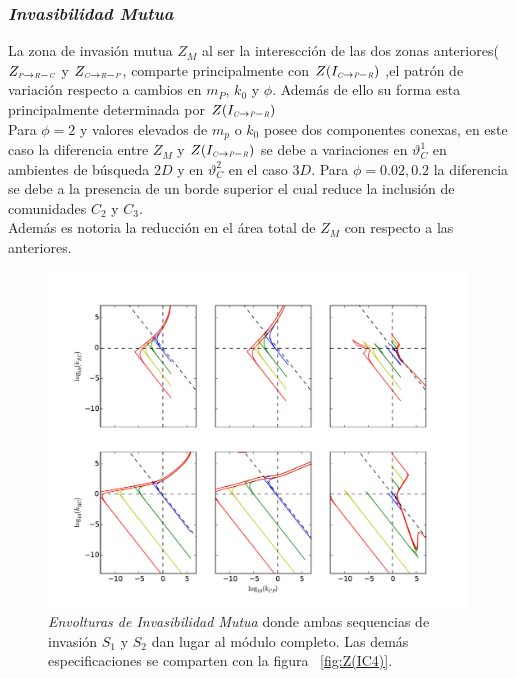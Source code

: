 \subsubsection{\emph{Invasibilidad Mutua}}

La zona de invasi\'on mutua $Z_M$ al ser la interescci\'on de las dos zonas anteriores($Z_{\textit{\tiny P} \to \textit{\tiny R}-\textit{\tiny C}}$ y $ Z_{\textit{\tiny C} \to \textit{\tiny R}-\textit{\tiny P}}$, comparte principalmente con $Z(I_{\textit{\tiny C} \to \textit{\tiny P}- \textit{\tiny R}})$ ,el patr\'on de variaci\'on respecto a cambios en $m_P$, $k_0$ y $\phi$. Adem\'as de ello su forma esta principalmente determinada por $Z(I_{\textit{\tiny C} \to \textit{\tiny P}- \textit{\tiny R}})$\\
Para $\phi = 2$ y valores elevados de $m_p$ o $k_0$ posee dos componentes conexas, en este caso la diferencia entre $Z_M$ y $Z(I_{\textit{\tiny C} \to \textit{\tiny P}- \textit{\tiny R}})$ se debe a variaciones en $\vartheta_C^1$ en ambientes de b\'usqueda $2D$ y en $\vartheta_C^2$ en el caso $3D$. Para $\phi = 0.02,0.2$ la diferencia se debe a la presencia de un borde superior el cual reduce la inclusi\'on de comunidades $C_2$ y $C_3$.\\
Adem\'as es notoria la reducci\'on en el \'area total de $Z_M$ con respecto a las anteriores.

\begin{figure}
  \centering
  \includegraphics[width = 0.99\textwidth]{./Plots/MutualInvAcGrGr.pdf}
  \caption[Env $I_M$]{\emph{Envolturas de Invasibilidad Mutua} donde ambas sequencias de invasi\'on $S_1$ y $S_2$ dan lugar al m\'odulo completo. Las dem\'as especificaciones se comparten con la figura ~\ref{fig:Z(IC4)}.}
  \label{fig:MutualInv}
\end{figure}


